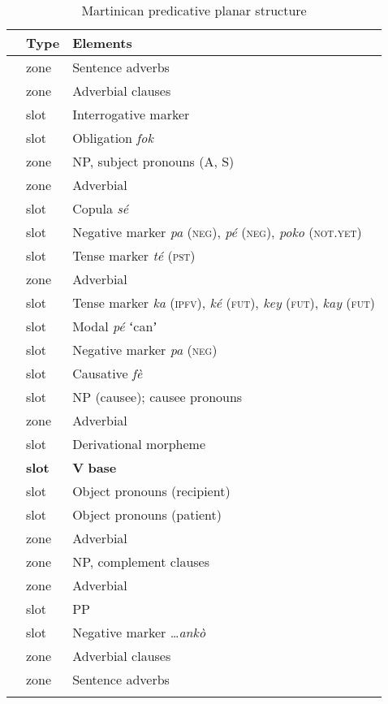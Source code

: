 \documentclass[output=paper]{langscibook}
\begin{document}
\begin{table}[t]
\caption{Martinican predicative planar structure}
\label{tab:mart:key:1}
\begin{tabular}{Sll}
\lsptoprule
{} & \textbf{Type} & \textbf{Elements}\\ \midrule
\label{mtsad1} & zone & Sentence adverbs\\
\label{mtadv2} & zone & Adverbial clauses\\
\label{mtint3} & slot & Interrogative marker\\
\label{mtobl4} & slot & Obligation \textit{fok}\\
\label{mtsub5} & zone & NP, subject pronouns (A, S)\\
\label{mtadv6} & zone & Adverbial \protect\footnotemark\\
\label{mtcop7} & slot & Copula \textit{sé}\\
\label{mtneg8} & slot & Negative marker \textit{pa} (\textsc{neg}), \textit{pé} (\textsc{neg}), \textit{poko} (\textsc{not.yet})\\
\label{mtten9} & slot & Tense marker \textit{té} (\textsc{pst})\\
\label{mtadv10} & zone & Adverbial\\
\label{mtten11} & slot & Tense marker \textit{ka} (\textsc{ipfv}), \textit{ké} (\textsc{fut}), \textit{key} (\textsc{fut}), \textit{kay} (\textsc{fut})\\
\label{mtmod12} & slot & Modal \textit{pé} ʻcanʼ\\
\label{mtneg13} & slot & Negative marker \textit{pa} (\textsc{neg})\\
\label{mtcau14} & slot & Causative \textit{fè}\\
\label{mtnpc15} & slot & NP (causee); causee pronouns\\
\label{mtadv16} & zone & Adverbial\\
\label{mtder17} & slot & Derivational morpheme\\
\label{mtbase18} & \textbf{slot} & \textbf{V} \textbf{base}\\
\label{mtobj19} & slot & Object pronouns (recipient)\\
\label{mtobj20} & slot & Object pronouns (patient)\\
\label{mtadv21} & zone & Adverbial\\
\label{mtnpc22} & zone & NP, complement clauses\\
\label{mtadv23} & zone & Adverbial\\
\label{mtpp24} & slot & PP\\
\label{mtneg25} & slot & Negative marker …\textit{ankò}\\
\label{mtadv26} & zone & Adverbial clauses\\
\label{mtsad27} & zone & Sentence adverbs\\
\lspbottomrule
\end{tabular}
\end{table}
\end{document}
